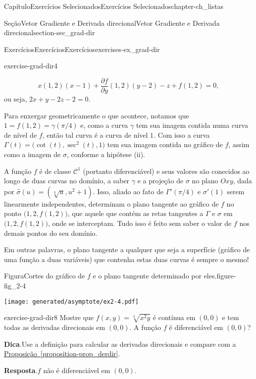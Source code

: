 \documentclass[oneside,10pt,]{book}
\newcommand{\blocktitlefont}{\relax}
\newcommand{\xreffont}{\relax}
\numberwithin{equation}{section}
\begin{document}
\begin{chapterptx}{Capítulo}{Exercícios Selecionados}{}{Exercícios Selecionados}{}{}{chapter-ch_listas}
\begin{sectionptx}{Seção}{Vetor Gradiente e Derivada direcional}{}{Vetor Gradiente e Derivada direcional}{}{}{section-sec_grad-dir}
\begin{exercises-subsection-numberless}{Exercícios}{Exercícios}{}{Exercícios}{}{}{exercises-ex_grad-dir}
\begin{divisionexercise}{4}{}{}{exercise-grad-dir4}
\begin{enumerate}[label=(\alph*)]
\begin{equation*}
{x}(1,2)(x-1) + \frac{\partial f}{\partial
y}(1,2)(y-2)-z+f(1,2)=0,
\end{equation*}
ou seja, \(2x+y-2z-2=0\).%
\end{enumerate}
%
\par
Para enxergar geometricamente o que acontece, notamos que \(1=f(1,2)=\gamma(\pi/4)\) e, como a curva \(\gamma\) tem sua imagem contida numa curva de nível de \(f\), então tal curva é a curva de nível \(1\). Com isso a curva \(\Gamma(t)=\big(\cot (t), \sec^2 (t),1\big)\) tem sua imagem contida no gráfico de \(f\), assim como a imagem de \(\sigma\), conforme a hipótese (ii).%
\par
A função \(f\) é de classe \(\mathscr{C}^1\) (portanto diferenciável) e seus valores são conecidos ao longo de duas curvas no domínio, a saber \(\gamma\) e a projeção de \(\sigma\) no plano \(Oxy\), dada por \(\hat\sigma(u)=(\sqrt[3]{u},u^2+1)\). Isso, aliado ao fato de \(\Gamma'(\pi/4)\) e \(\sigma'(1)\) serem linearmente independentes, determinam o plano tangente ao gráfico de \(f\) no ponto \(\big(1,2,f(1,2)\big)\), que aquele que contém as retas tangentes a \(\Gamma\) e \(\sigma\) em \(\big(1,2,f(1,2)\big)\), onde se interceptam. Tudo isso é feito sem saber o valor de \(f\) nos demais pontos do seu domínio.%
\par
Em outras palavras, o plano tangente a qualquer que seja a superfície (gráfico de uma função a duas variáveis) que contenha estas duas curvas é sempre o mesmo!%
\begin{figureptx}{Figura}{Cortes do gráfico de \(f\) e o plano tangente determinado por eles.}{figure-fig_2-4}{}%
\begin{image}{0}{1}{0}{}%
\texttt{[image: generated/asymptote/ex2-4.pdf]}
\end{image}%
\tcblower
\end{figureptx}%
\end{divisionexercise}%
\begin{divisionexercise}{8}{}{}{exercise-grad-dir8}%
Mostre que \(f(x,y) = \sqrt[3]{x^2y}\) é contínua em \((0,0)\) e tem todas as derivadas direcionais em \((0,0)\). A função \(f\) é diferenciável em \((0,0)\)?%
\par\smallskip%
\noindent\textbf{\blocktitlefont Dica}.\hypertarget{hint-grad-dir8-b}{}\quad{}Use a definição para calcular as derivadas direcionais e compare com a \hyperref[proposition-prop_derdir]{Proposição~{\xreffont\ref{proposition-prop_derdir}}}.%
\par\smallskip%
\noindent\textbf{\blocktitlefont Resposta}.\hypertarget{answer-grad-dir8-c}{}\quad{}\(f\) não é diferenciável em \((0,0)\).%

\end{divisionexercise}
\end{exercises-subsection-numberless}
\end{sectionptx}
\end{chapterptx}
\end{document}
